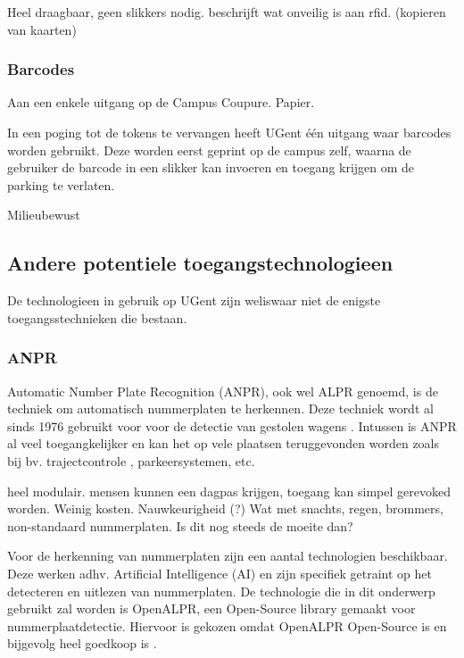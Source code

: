 Heel draagbaar, geen slikkers nodig.
\textcite{aalsalem2015automated} beschrijft wat onveilig is aan rfid. (kopieren van kaarten)

\subsubsection{Barcodes}
Aan een enkele uitgang op de Campus Coupure.
Papier.

In een poging tot de tokens te vervangen heeft UGent één uitgang waar barcodes worden gebruikt. Deze worden eerst geprint op de campus zelf, waarna de gebruiker de barcode in een slikker kan invoeren en toegang krijgen om de parking te verlaten.


Milieubewust

\subsection{Andere potentiele toegangstechnologieen}
De technologieen in gebruik op UGent zijn weliswaar niet de enigste toegangsstechnieken die bestaan.

\subsubsection{ANPR}

Automatic Number Plate Recognition (ANPR), ook wel ALPR genoemd, is de techniek om automatisch nummerplaten te herkennen. Deze techniek wordt al sinds 1976 gebruikt voor voor de detectie van gestolen wagens \autocite{uk2011anpr}. Intussen is ANPR al veel toegangkelijker en kan het op vele plaatsen teruggevonden worden zoals bij bv. trajectcontrole \autocite{de2014snelheidscamera}, parkeersystemen, etc.
\par
heel modulair. mensen kunnen een dagpas krijgen, toegang kan simpel gerevoked worden. Weinig kosten. Nauwkeurigheid (?)
Wat met snachts, regen, brommers, non-standaard nummerplaten. Is dit nog steeds de moeite dan?
\par
Voor de herkenning van nummerplaten zijn een aantal technologien beschikbaar. Deze werken adhv. Artificial Intelligence (AI) en zijn specifiek getraint op het detecteren en uitlezen van nummerplaten.
De technologie die in dit onderwerp gebruikt zal worden is OpenALPR, een Open-Source library gemaakt voor nummerplaatdetectie. Hiervoor is gekozen omdat OpenALPR Open-Source is en bijgevolg heel goedkoop is \autocite{openalprgithub} .

